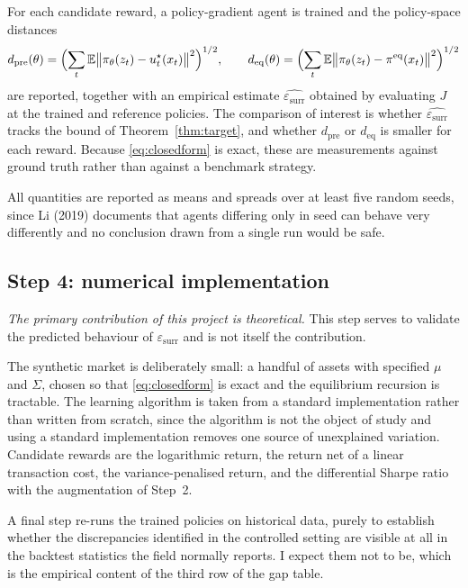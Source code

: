 \documentclass[11pt,a4paper]{article}
\theoremstyle{plain}
\theoremstyle{definition}
\newcommand{\E}{\mathbb{E}}
\newcommand{\pieq}{\pi^{\mathrm{eq}}}
\newcommand{\epssurr}{\varepsilon_{\mathrm{surr}}}
\begin{document}
For each candidate reward, a policy-gradient agent is trained and the policy-space
distances
\begin{equation}
d_{\mathrm{pre}}(\theta)=\Bigl(\sum_t\E\bigl\|\pi_\theta(z_t)-u_t^{\star}(x_t)\bigr\|^2\Bigr)^{1/2},
\qquad
d_{\mathrm{eq}}(\theta)=\Bigl(\sum_t\E\bigl\|\pi_\theta(z_t)-\pieq(x_t)\bigr\|^2\Bigr)^{1/2}
\end{equation}
are reported, together with an empirical estimate $\widehat{\epssurr}$ obtained by
evaluating $J$ at the trained and reference policies. The comparison of interest is
whether $\widehat{\epssurr}$ tracks the bound of Theorem~\ref{thm:target}, and whether
$d_{\mathrm{pre}}$ or $d_{\mathrm{eq}}$ is smaller for each reward. Because
\eqref{eq:closedform} is exact, these are measurements against ground truth rather than
against a benchmark strategy.

All quantities are reported as means and spreads over at least five random seeds, since
Li (2019) documents that agents differing only in seed can behave very
differently and no conclusion drawn from a single run would be safe.

\subsection{Step 4: numerical implementation}

\emph{The primary contribution of this project is theoretical.} This step serves to
validate the predicted behaviour of $\epssurr$ and is not itself the contribution.

The synthetic market is deliberately small: a handful of assets with specified $\mu$ and
$\Sigma$, chosen so that \eqref{eq:closedform} is exact and the equilibrium recursion is
tractable. The learning algorithm is taken from a standard implementation rather than
written from scratch, since the algorithm is not the object of study and using a
standard implementation removes one source of unexplained variation. Candidate rewards
are the logarithmic return, the return net of a linear transaction cost, the
variance-penalised return, and the differential Sharpe ratio with the augmentation of
Step~2.

A final step re-runs the trained policies on historical data, purely to establish whether
the discrepancies identified in the controlled setting are visible at all in the
backtest statistics the field normally reports. I expect them not to be, which is the
empirical content of the third row of the gap table.
\end{document}
